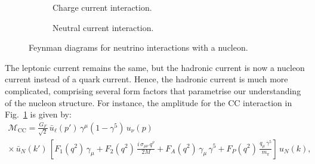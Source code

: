 \begin{figure}[h]
  \centering
  \begin{subfigure}[b]{0.45\textwidth}
    \centering
    \caption{Charge current interaction.}
    \label{fig:cc-interaction-n}
  \end{subfigure}
  \hfill
  \begin{subfigure}[b]{0.45\textwidth}
    \centering
    \caption{Neutral current interaction.}
    \label{fig:nc-interaction-n}
  \end{subfigure}
  \caption{Feynman diagrams for neutrino interactions with a nucleon.}
  \label{fig:nu-n-feyn}
\end{figure}
The leptonic current remains the same, but the hadronic current is now a nucleon current instead of a quark current.
Hence, the hadronic current is much more complicated, comprising several form factors that parametrise our understanding of the nucleon structure.
For instance, the amplitude for the CC interaction in Fig.~\ref{fig:cc-interaction-n} is given by:
\begin{align}
  \mathcal{M}_{\text{CC}} = \frac{G_F}{\sqrt{2}} \,\bar{u}_\ell(p')\,\gamma^\mu (1 - \gamma^5)\,u_\nu(p) \\
  \times \,\bar{u}_N(k')\,\left[ F_1(q^2)\,\gamma_\mu + F_2(q^2)\,\frac{i\,\sigma_{\mu\nu}\,q^\nu}{2M} + F_A(q^2)\,\gamma_\mu\,\gamma^5 + F_P(q^2)\,\frac{q_\mu\,\gamma^5}{m_\pi} \right]\,u_N(k),
\end{align}
